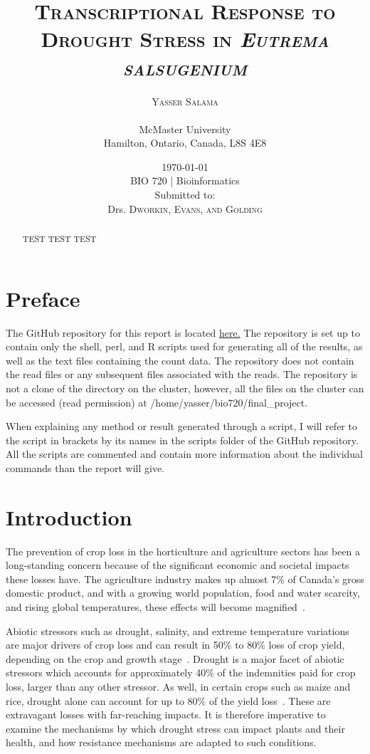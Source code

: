\documentclass[12pt]{article}
\title{\textsc{Transcriptional Response to Drought Stress in \textit{Eutrema salsugenium}}}
\author{
	{\textsc{\Large Yasser Salama}}\\
	\\
	{McMaster University}\\
	{Hamilton, Ontario, Canada, L8S 4E8}\\
	}
\date{
	{\today}\\
	{\vfill BIO 720 | Bioinformatics}\\
	{Submitted to:}\\
	{Drs. \textsc{Dworkin, Evans, and Golding}}
	}
\begin{document}
	\maketitle
	\thispagestyle{empty}
	\clearpage
	\begin{abstract}
		TEST TEST TEST
	\end{abstract}
	\clearpage
	\tableofcontents
	\listoffigures
	\clearpage
	\section*{Preface}
	The GitHub repository for this report is located \href{https://github.com/salamayg/BIO720}{here.} The repository is set up to contain only the shell, perl, and R scripts used for generating all of the results, as well as the text files containing the count data. The repository does not contain the read files or any subsequent files associated with the reads. The repository is not a clone of the directory on the cluster, however, all the files on the cluster can be accessed (read permission) at /home/yasser/bio720/final\_project. 
	
	When explaining any method or result generated through a script, I will refer to the script in brackets by its names in the scripts folder of the GitHub repository. All the scripts are commented and contain more information about the individual commands than the report will give. 
	\clearpage
	\section{Introduction}
	The prevention of crop loss in the horticulture and agriculture sectors has been a long-standing concern because of the significant economic and societal impacts these losses have. The agriculture industry makes up almost 7\% of Canada's gross domestic product, and with a growing world population, food and water scarcity, and rising global temperatures, these effects will become magnified~\cite{govcan:2015:Online,asseng2015rising,schewe2014multimodel}. 
	
	Abiotic stressors such as drought, salinity, and extreme temperature variations are major drivers of crop loss and can result in 50\% to 80\% loss of crop yield, depending on the crop and growth stage~\cite{boyer1982plant}. Drought is a major facet of abiotic stressors which accounts for approximately 40\% of the indemnities paid for crop loss, larger than any other stressor. As well, in certain crops such as maize and rice, drought alone can account for up to 80\% of the yield loss~\cite{farooq2009plant}. These are extravagant losses with far-reaching impacts. It is therefore imperative to examine the mechanisms by which drought stress can impact plants and their health, and how resistance mechanisms are adapted to such conditions.
	
\end{document}
